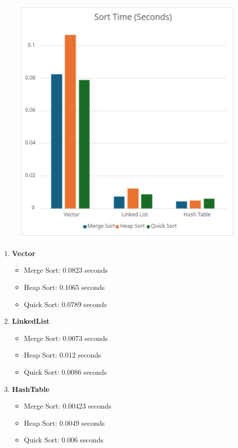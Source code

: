 \documentclass[12pt]{article}
\begin{document}
\begin{figure}[H]
	\begin{center}
		\includegraphics[scale=0.5]{SortTime.png}
	\end{center}
\end{figure}




\begin{enumerate}
	\item \textbf{Vector}
		  \begin{itemize}
		  	\item Merge Sort: 0.0823 seconds
		  	\item Heap Sort: 0.1065 seconds
		  	\item Quick Sort: 0.0789 seconds
		  \end{itemize}
	\item \textbf{LinkedList}
		  \begin{itemize}
		  	\item Merge Sort: 0.0073 seconds
		  	\item Heap Sort: 0.012 seconds
		  	\item Quick Sort: 0.0086 seconds
		  \end{itemize}
	\item \textbf{HashTable}
		  \begin{itemize}
		  	\item Merge Sort: 0.00423 seconds
		  	\item Heap Sort: 0.0049 seconds
		  	\item Quick Sort: 0.006 seconds
		  \end{itemize}
\end{enumerate}
\end{document}
